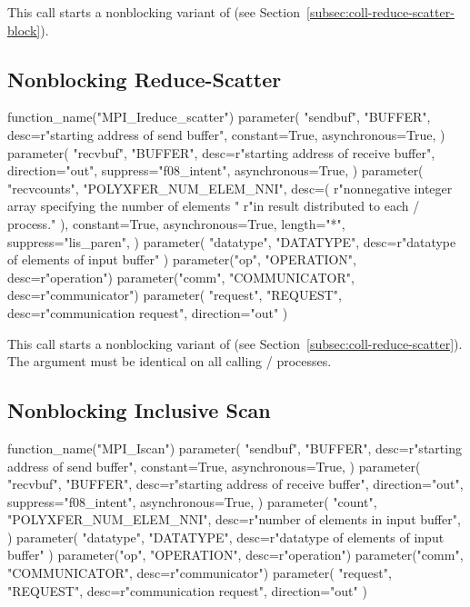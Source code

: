 This call starts a nonblocking variant of 
(see Section~\ref{subsec:coll-reduce-scatter-block}).


\subsection{Nonblocking Reduce-Scatter}
\label{sec:nbcoll-reduce-scatter}

%
\begin{mpi-binding}
    function_name("MPI_Ireduce_scatter")
    parameter(
        "sendbuf",
        "BUFFER",
        desc=r"starting address of send buffer",
        constant=True,
        asynchronous=True,
    )
    parameter(
        "recvbuf",
        "BUFFER",
        desc=r"starting address of receive buffer",
        direction="out",
        suppress="f08_intent",
        asynchronous=True,
    )
    parameter(
        "recvcounts",
        "POLYXFER_NUM_ELEM_NNI",
        desc=(
            r"nonnegative integer array specifying the number of elements "
            r"in result distributed to each \MPI/ process."
        ),
        constant=True,
        asynchronous=True,
        length="*",
        suppress="lis_paren",
    )
    parameter(
        "datatype", "DATATYPE", desc=r"datatype of elements of input buffer"
    )
    parameter("op", "OPERATION", desc=r"operation")
    parameter("comm", "COMMUNICATOR", desc=r"communicator")
    parameter(
        "request", "REQUEST", desc=r"communication request", direction="out"
    )
\end{mpi-binding}

This call starts a nonblocking variant of 
(see Section~\ref{subsec:coll-reduce-scatter}). The  argument
must be identical on all calling \MPI/ processes.

\subsection{Nonblocking Inclusive Scan}
\label{subsec:nbcoll-iscan}

%
\begin{mpi-binding}
    function_name("MPI_Iscan")
    parameter(
        "sendbuf",
        "BUFFER",
        desc=r"starting address of send buffer",
        constant=True,
        asynchronous=True,
    )
    parameter(
        "recvbuf",
        "BUFFER",
        desc=r"starting address of receive buffer",
        direction="out",
        suppress="f08_intent",
        asynchronous=True,
    )
    parameter(
        "count",
        "POLYXFER_NUM_ELEM_NNI",
        desc=r"number of elements in input buffer",
    )
    parameter(
        "datatype", "DATATYPE", desc=r"datatype of elements of input buffer"
    )
    parameter("op", "OPERATION", desc=r"operation")
    parameter("comm", "COMMUNICATOR", desc=r"communicator")
    parameter(
        "request", "REQUEST", desc=r"communication request", direction="out"
    )
\end{mpi-binding}


